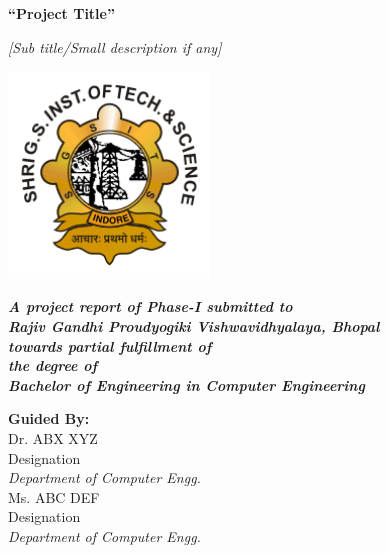 \begin{titlepage}
    \centering
    \LARGE
    \textbf{``Project Title''}
    
    \Large
    \textit{[Sub title/Small description if any]}
    
    \vspace*{0.7cm}
    
    \includegraphics[width=0.4\textwidth]{images/logo.png}
    
    \vspace*{0.7cm}
    
    \textit{\textbf{A project report of Phase-I submitted to\\
    Rajiv Gandhi Proudyogiki Vishwavidhyalaya, Bhopal \\
    towards partial fulfillment of \\
    the degree of \\ 
    Bachelor of Engineering in Computer Engineering}}
    
    
    \vspace*{\fill}
    \large
    \begin{minipage}[t]{0.45\textwidth}
    \flushleft
    \textbf{Guided By:\\}
    Dr. ABX XYZ \\
    Designation \\
    \emph{Department of Computer Engg.} \\
    \vspace*{0.5cm}
    Ms. ABC DEF \\
    Designation \\
    \emph{Department of Computer Engg.} \\
    \end{minipage}
    \hfill
    \begin{minipage}[t]{0.45\textwidth}
    

\end{minipage}
\end{titlepage}
